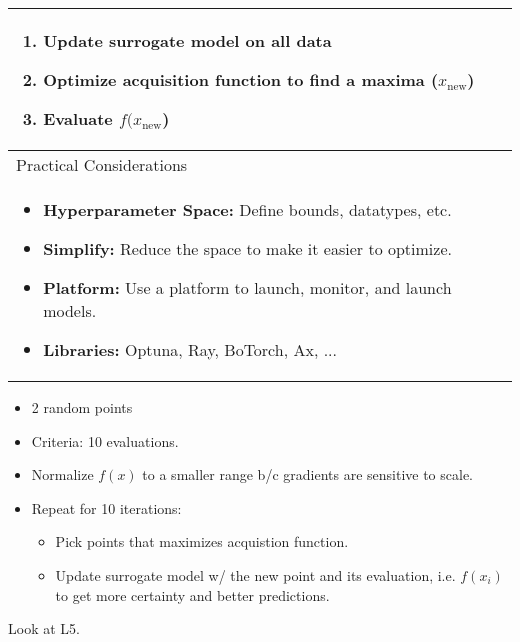 \begin{summary}
\begin{center}
\begin{tabular}{ll}
{\begin{enumerate}
\begin{enumerate}
                        \item Update surrogate model on all data
                        \item Optimize acquisition function to find a maxima ($x_{\text{new}}$)
                        \item Evaluate $f(x_{\text{new}}$)
                    \end{enumerate}
                \end{enumerate}
            } \\
            \midrule 
            Practical Considerations & \\
            \multicolumn{2}{p{\linewidth}}{
                \begin{itemize}
                    \item \textbf{Hyperparameter Space:} Define bounds, datatypes, etc.
                    \item \textbf{Simplify:} Reduce the space to make it easier to optimize.
                    \item \textbf{Platform:} Use a platform to launch, monitor, and launch models.
                    \item \textbf{Libraries:} Optuna, Ray, BoTorch, Ax, ...
                \end{itemize}
            } \\
            \bottomrule
        \end{tabular}
    \end{center}
\end{summary}

\begin{example}
    \begin{itemize}
        \item 2 random points
        \item Criteria: 10 evaluations.
        \item Normalize $f(x)$ to a smaller range b/c gradients are sensitive to scale.
        \item Repeat for 10 iterations:
        \begin{itemize}
            \item Pick points that maximizes acquistion function.
            \item Update surrogate model w/ the new point and its evaluation, i.e. $f(x_i)$ to get more certainty and better predictions.
        \end{itemize}
    \end{itemize}
    \vspace{1em}

    Look at L5.
\end{example}

